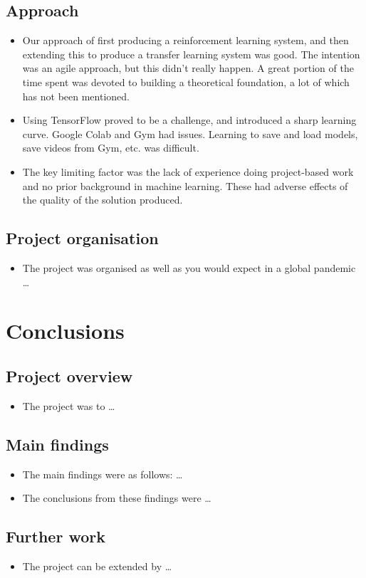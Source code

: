 \documentclass[12pt,a4paper]{article}
\begin{document}
\subsection{Approach}
\begin{itemize}
    \item Our approach of first producing a reinforcement learning system, and then extending this to produce a transfer learning system was good. The intention was an agile approach, but this didn't really happen. A great portion of the time spent was devoted to building a theoretical foundation, a lot of which has not been mentioned.
    \item Using TensorFlow proved to be a challenge, and introduced a sharp
    learning curve. Google Colab and Gym had issues. Learning to save and load models, save videos from Gym, etc. was difficult. 
    \item The key limiting factor was the lack of experience doing project-based work and no prior background in machine learning. These had adverse effects of the quality of the solution produced.
\end{itemize}

\subsection{Project organisation}
\begin{itemize}
    \item The project was organised as well as you would expect in a global pandemic \dots
\end{itemize}

\newpage
\section{Conclusions}
\subsection{Project overview}
\begin{itemize}
    \item The project was to \dots
\end{itemize}

\subsection{Main findings}
\begin{itemize}
    \item The main findings were as follows: \dots
    \item The conclusions from these findings were \dots
\end{itemize}

\subsection{Further work}
\begin{itemize}
    \item The project can be extended by \dots
\end{itemize}

\newpage

\end{document}
